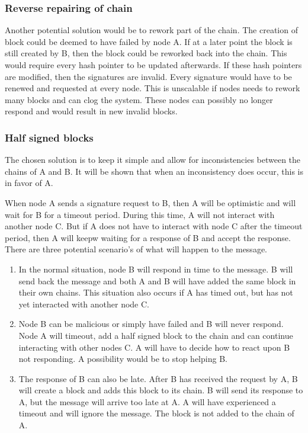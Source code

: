 \subsubsection{Reverse repairing of chain}
Another potential solution would be to rework part of the chain.
The creation of block could be deemed to have failed by node A.
If at a later point the block is still created by B,
then the block could be reworked back into the chain.
This would require every hash pointer to be updated afterwards.
If these hash pointers are modified, then the signatures are invalid.
Every signature would have to be renewed and requested at every node.
This is unscalable if nodes needs to rework many blocks and can clog the system.
These nodes can possibly no longer respond and would result in new invalid blocks.

\subsubsection{Half signed blocks}
\label{des:halfsigned}
The chosen solution is to keep it simple and allow for inconsistencies between the chains of A and B.
It will be shown that when an inconsistency does occur, this is in favor of A.

When node A sends a signature request to B,
then A will be optimistic and will wait for B for a timeout period.
During this time, A will not interact with another node C.
But if A does not have to interact with node C after the timeout period,
then A will keepw waiting for a response of B and accept the response.
There are three potential scenario's of what will happen to the message.

\begin{enumerate}
\item
In the normal situation, node B will respond in time to the message.
B will send back the message
and both A and B will have added the same block in their own chains.
This situation also occurs if A has timed out,
but has not yet interacted with another node C.

\item
Node B can be malicious or simply have failed and B will never respond.
Node A will timeout, add a half signed block to the chain and can continue interacting with other nodes C.
A will have to decide how to react upon B not responding.
A possibility would be to stop helping B.

\item
The response of B can also be late.
After B has received the request by A,
B will create a block and adds this block to its chain.
B will send its response to A,
but the message will arrive too late at A.
A will have experienced a timeout and  will ignore the message.
The block is not added to the chain of A.
\end{enumerate}

